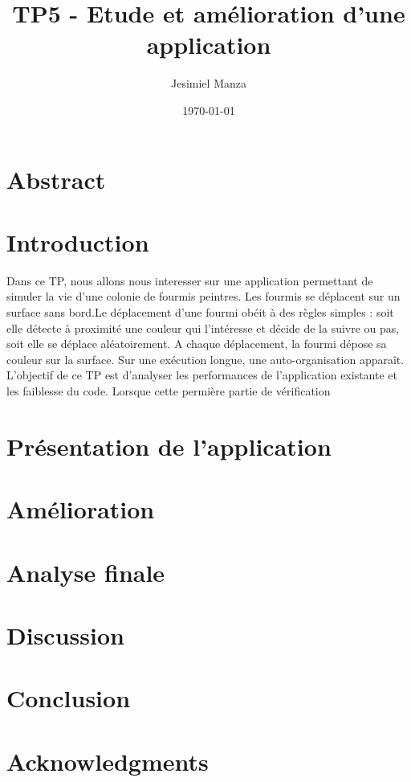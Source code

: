\documentclass[a4paper,12pt]{article}
\title{TP5 - Etude et amélioration d’une application}
\author{Jesimiel Manza}
\date{\today}
\begin{document}
\maketitle

\section*{Abstract}

\section{Introduction}
Dans ce TP, nous allons nous interesser sur une application permettant de simuler la vie d'une colonie de fourmis peintres. Les fourmis se déplacent sur un surface sans bord.Le déplacement d’une fourmi obéit à des règles simples : soit elle détecte à proximité une couleur qui l’intéresse et décide de la suivre ou pas, soit elle se déplace aléatoirement. A chaque déplacement, la fourmi dépose sa couleur sur la surface. Sur une exécution longue, une auto-organisation apparaît. 
L'objectif de ce TP est d'analyser les performances de l'application existante et les faiblesse du code. Lorsque cette permière partie de vérification 

\section{Présentation de l'application}

\section{Amélioration}

\section{Analyse finale}

\section{Discussion}

\section{Conclusion}

\section*{Acknowledgments}

\begin{thebibliography}{9}
\end{thebibliography}
\end{document}
